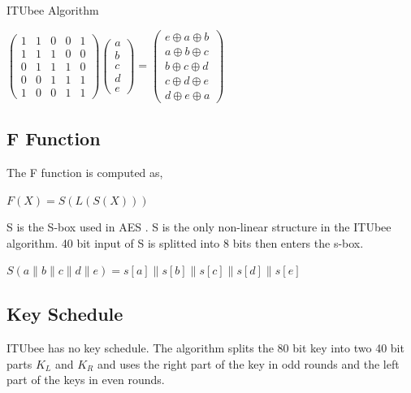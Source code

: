 \documentclass [version=final]{iacrcc}
\begin{document}
\begin{section}{ITUbee Algorithm}
\begin{center}
    $
    \begin{pmatrix}
    1 & 1 & 0 & 0 & 1 \\
    1 & 1 & 1 & 0 & 0 \\
    0 & 1 & 1 & 1 & 0 \\
    0 & 0 & 1 & 1 & 1 \\
    1 & 0 & 0 & 1 & 1
    \end{pmatrix}
    \begin{pmatrix}
    a \\
    b \\
    c \\
    d \\
    e
    \end{pmatrix}
    =
    \begin{pmatrix}
    e \oplus a \oplus b \\
    a \oplus b \oplus c \\
    b \oplus c \oplus d \\
    c \oplus d \oplus e \\
    d \oplus e \oplus a
    \end{pmatrix}
    $
\end{center}


\subsection{F Function}
The F function is computed as,\\
\begin{center}
    $F (X) = S(L(S(X)))$
\end{center}

S is the S-box used in AES \cite{dworkin2001advanced}. S is the only non-linear structure in the ITUbee algorithm.  40 bit input of S is splitted into 8 bits then enters the s-box.
\begin{center}
    $S(a\parallel b \parallel c \parallel d \parallel e) = s[a] \parallel s[b] \parallel s[c] \parallel s[d] \parallel s[e]$ 
\end{center}

\subsection{Key Schedule}

ITUbee has no key schedule. The algorithm splits the 80 bit key into two 40 bit parts $K_L$ and $K_R$ and uses the right part of the key in odd rounds and the left part of the keys in even rounds.



\end{section}
\end{document}
